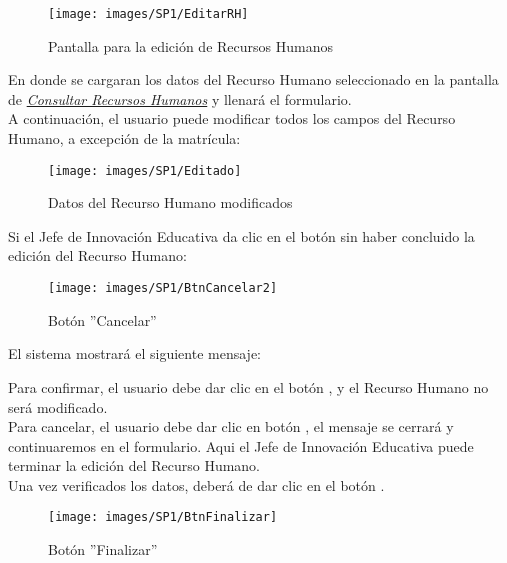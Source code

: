        \begin{figure}[!hbtp]
        	\centering
        	\hypertarget{editarrh}{\texttt{[image: images/SP1/EditarRH]}}
        	\caption{Pantalla para la edición de Recursos Humanos}
        	\label{editarrh}
        \end{figure}

        En donde se cargaran los datos del Recurso Humano seleccionado en la pantalla de \hyperlink{consultarrh}{\textit{Consultar Recursos Humanos}} y llenará el formulario.\\
        
        A continuación, el usuario puede modificar todos los campos del Recurso Humano, a excepción de la matrícula:
        \begin{figure}[!hbtp]
        	\centering
        	\hypertarget{modif}{\texttt{[image: images/SP1/Editado]}}
        	\caption{Datos del Recurso Humano modificados}
        	\label{modif}
        \end{figure}

        Si el Jefe de Innovación Educativa da clic en el botón  sin haber concluido la edición del Recurso Humano:
        
        \begin{figure}[!hbtp]
        	\centering
        	\hypertarget{cancel2}{\texttt{[image: images/SP1/BtnCancelar2]}}
        	\caption{Botón ''Cancelar''}
        	\label{cancel2}
        \end{figure}
        
        El sistema mostrará el siguiente mensaje:
        
        Para confirmar, el usuario debe dar clic en el botón , y el Recurso Humano no será modificado.\\
        
        Para cancelar, el usuario debe dar clic en botón , el mensaje se cerrará y continuaremos en el formulario. Aqui el Jefe de Innovación Educativa puede terminar la edición del Recurso Humano.\\

        Una vez verificados los datos, deberá de dar clic en el botón .
        \begin{figure}[!hbtp]
        	\centering
        	\hypertarget{btnfin}{\texttt{[image: images/SP1/BtnFinalizar]}}
        	\caption{Botón ''Finalizar''}
        	\label{btnfin}
        \end{figure}
        
